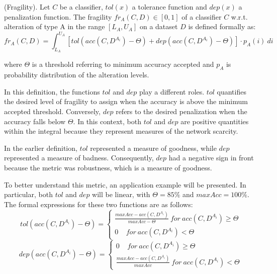 \begin{definition} (Fragility).
	Let $C$ be a classifier, $tol(x)$ a tolerance function and $dep(x)$ a penalization function.
	The fragility $fr_A(C,D) \in [0,1]$ of a classifier $C$ w.r.t. alteration of type A in the range $[L_A, U_A]$ on a dataset $D$ is defined formally as:
	\[
		fr_A(C,D) = \int_{L_A}^{U_A} [tol(acc(C,D^{A_i}) - \Theta) + dep(acc(C,D^{A_i}) - \Theta)] \cdot p_A(i)\ di
	\]
	
	where $\Theta$ is a threshold referring to minimum accuracy accepted and $p_A$ is probability distribution of the alteration levels.
\end{definition}

In this definition, the functions $tol$ and $dep$ play a different roles. $tol$ quantifies the desired level of fragility to assign when the accuracy is above the minimum accepted threshold. Conversely, $dep$ refers to the desired penalization when the accuracy falls below $\Theta$. In this context, both $tol$ and $dep$ are positive quantities within the integral because they represent measures of the network scarcity.

In the earlier definition, $tol$ represented a measure of goodness, while $dep$ represented a measure of badness. Consequently, $dep$ had a negative sign in front because the metric was robustness, which is a measure of goodness.

To better understand this metric, an application example will be presented. In particular, both $tol$ and $dep$ will be linear, with $\Theta= 85\%$ and $maxAcc = 100 \%$. The formal expressions for these two functions are as follows:
\[
	tol(acc(C,D^{A_i}) - \Theta) = \begin{cases}
		\frac{maxAcc - acc(C,D^{A_i})}{maxAcc - \Theta}  \ for  \ acc(C,D^{A_i}) \ge \Theta\\
		0  \ \ \ \ \ for  \ acc(C,D^{A_i}) < \Theta
	\end{cases}
\]
\[
	dep(acc(C,D^{A_i}) - \Theta) = \begin{cases}
		0 \ \ \ \ \ for \ acc(C,D^{A_i}) \ge \Theta\\
		\frac{maxAcc - acc(C,D^{A_i})}{maxAcc} \ for  \ acc(C,D^{A_i}) < \Theta
	\end{cases}
\]

